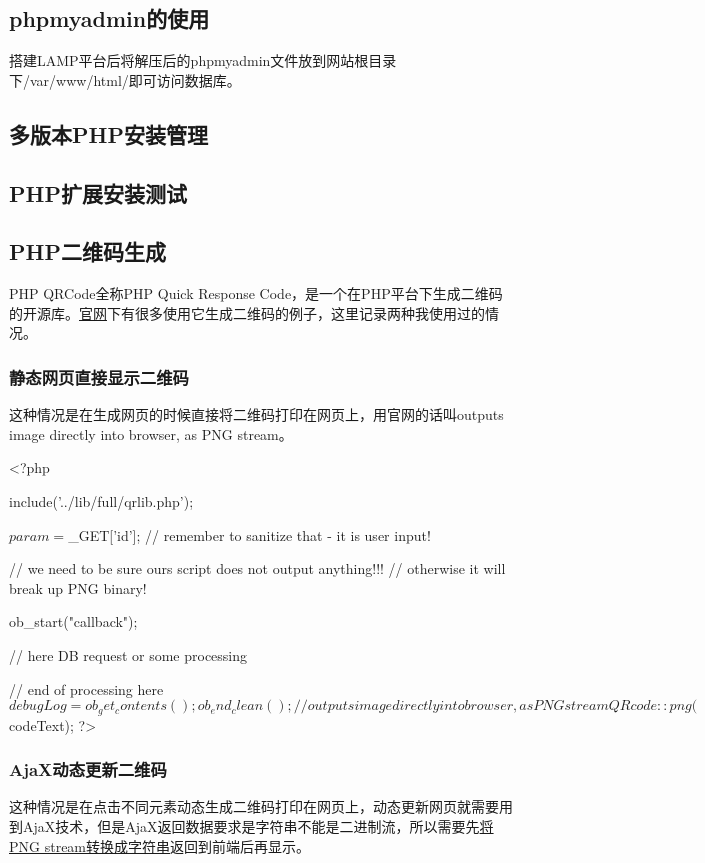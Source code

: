 \subsection{phpmyadmin的使用}
搭建LAMP平台后将解压后的phpmyadmin文件放到网站根目录下/var/www/html/即可访问数据库。
\subsection{多版本PHP安装管理}
\subsection{PHP扩展安装测试}
\subsection{PHP二维码生成}
PHP QRCode全称PHP Quick Response Code，是一个在PHP平台下生成二维码的开源库。\href{https://phpqrcode.sourceforge.net/}{官网}下有很多使用它生成二维码的例子，这里记录两种我使用过的情况。
\subsubsection{静态网页直接显示二维码}
这种情况是在生成网页的时候直接将二维码打印在网页上，用官网的话叫outputs image directly into browser, as PNG stream。
\begin{shell}
 <?php

    include('../lib/full/qrlib.php');
        
    $param = $_GET['id']; // remember to sanitize that - it is user input!
    
    // we need to be sure ours script does not output anything!!!
    // otherwise it will break up PNG binary!
    
    ob_start("callback");
    
    // here DB request or some processing
    
    // end of processing here
    $debugLog = ob_get_contents();
    ob_end_clean();
    
    // outputs image directly into browser, as PNG stream
    QRcode::png($codeText); 
?>
\end{shell}
\subsubsection{AjaX动态更新二维码}
这种情况是在点击不同元素动态生成二维码打印在网页上，动态更新网页就需要用到AjaX技术，但是AjaX返回数据要求是字符串不能是二进制流，所以需要先\href{https://blog.csdn.net/LJFPHP/article/details/79111844}{将PNG stream转换成字符串}返回到前端后再显示。
